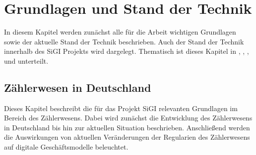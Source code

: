 \chapter{Grundlagen und Stand der Technik}\label{ch:TGrundlagen und Stand der Technik}
    In diesem Kapitel werden zunächst alle für die Arbeit wichtigen Grundlagen sowie der aktuelle Stand der Technik beschrieben. Auch der Stand der Technik innerhalb des SiGI Projekts wird dargelegt. Thematisch ist dieses Kapitel in , , ,  und  unterteilt.

\section{Zählerwesen in Deutschland}\label{sec:Zaehlerwesen in Deutschland}
    Dieses Kapitel beschreibt die für das Projekt SiGI relevanten Grundlagen im Bereich des Zählerwesens. Dabei wird zunächst die Entwicklung des Zählerwesens in Deutschland bis hin zur aktuellen Situation beschrieben. Anschließend werden die Auswirkungen von aktuellen Veränderungen der Regularien des Zählerwesens auf digitale Geschäftsmodelle beleuchtet.

